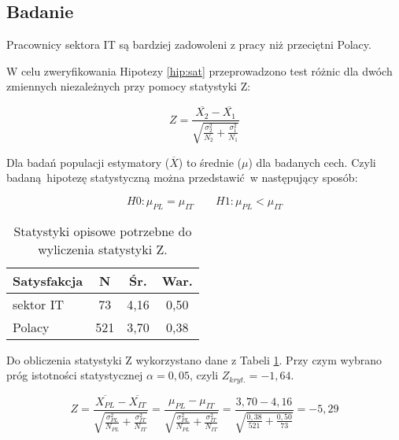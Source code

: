 \subsection{Badanie}
\begin{hyp}
  Pracownicy sektora IT są bardziej zadowoleni z pracy niż przeciętni Polacy.
  \label{hip:sat}
\end{hyp}

W celu zweryfikowania Hipotezy \ref{hip:sat} przeprowadzono test różnic dla dwóch zmiennych niezależnych przy pomocy statystyki Z:

\begin{equation}
  Z = \frac{\overline{X_2} - \overline{X_1}}{\sqrt{\frac{\sigma^2_2}{N_2}+\frac{\sigma^2_1}{N_1}}}
\end{equation}

Dla badań populacji estymatory ($\overline{X}$) to średnie ($\mu$) dla badanych cech. Czyli badaną hipotezę statystyczną można przedstawić w następujący sposób:

\begin{equation}
  H0: \mu_{PL} = \mu_{IT} \qquad H1: \mu_{PL} < \mu_{IT}
\end{equation}

\begin{table}[h!b]
  \begin{center}
    \begin{tabular}{l | c c c }
      Satysfakcja & N & Śr. & War. \\ \hline
      sektor IT & 73 & 4,16 & 0,50 \\
      Polacy & 521 & 3,70 & 0,38 \\
    \end{tabular}
  \end{center}
  \caption{Statystyki opisowe potrzebne do wyliczenia statystyki Z.}
  \label{tab:jss-norms-data}
\end{table}

Do obliczenia statystyki Z wykorzystano dane z Tabeli \ref{tab:jss-norms-data}. Przy czym wybrano próg istotności statystycznej $\alpha = 0,05$, czyli $Z_{kryt.} = -1,64$.

\begin{equation}
  Z = \frac{\overline{X_{PL}} - \overline{X_{IT}}}{\sqrt{\frac{\sigma^2_{PL}}{N_{PL}}+\frac{\sigma^2_{IT}}{N_{IT}}}} = \frac{\mu_{PL} - \mu_{IT}}{\sqrt{\frac{\sigma^2_{PL}}{N_{PL}}+\frac{\sigma^2_{IT}}{N_{IT}}}} = \frac{3,70 - 4,16}{\sqrt{\frac{0,38}{521}+\frac{0,50}{73}}} = -5,29 
\end{equation}

